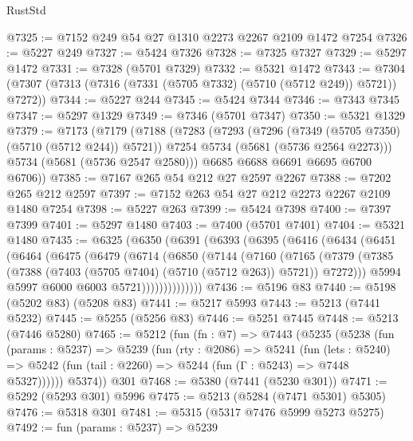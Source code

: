 \begin{lexlean}{RustStd}
\begin{coremodule}
@7325 := @7152 @249 @54 @27 @1310 @2273 @2267 @2109 @1472 @7254
@7326 := @5227 @249
@7327 := @5424 @7326
@7328 := @7325 @7327
@7329 := @5297 @1472
@7331 := @7328 (@5701 @7329)
@7332 := @5321 @1472
@7343 := @7304 (@7307 (@7313 (@7316 (@7331 (@5705 @7332) (@5710 (@5712 @249)) @5721)) @7272))
@7344 := @5227 @244
@7345 := @5424 @7344
@7346 := @7343 @7345
@7347 := @5297 @1329
@7349 := @7346 (@5701 @7347)
@7350 := @5321 @1329
@7379 := @7173
    (@7179
      (@7188
        (@7283
          (@7293
            (@7296 (@7349 (@5705 @7350) (@5710 (@5712 @244)) @5721))
            @7254
            @5734
            (@5681 (@5736 @2564 @2273)))
          @5734
          (@5681 (@5736 @2547 @2580)))
        @6685
        @6688
        @6691
        @6695
        @6700
        @6706))
@7385 := @7167 @265 @54 @212 @27 @2597 @2267
@7388 := @7202 @265 @212 @2597
@7397 := @7152 @263 @54 @27 @212 @2273 @2267 @2109 @1480 @7254
@7398 := @5227 @263
@7399 := @5424 @7398
@7400 := @7397 @7399
@7401 := @5297 @1480
@7403 := @7400 (@5701 @7401)
@7404 := @5321 @1480
@7435 := @6325
    (@6350
      (@6391
        (@6393
          (@6395
            (@6416
              (@6434
                (@6451
                  (@6464
                    (@6475
                      (@6479
                        (@6714
                          (@6850
                            (@7144
                              (@7160
                                (@7165
                                  (@7379
                                    (@7385
                                      (@7388 (@7403 (@5705 @7404) (@5710 (@5712 @263)) @5721))
                                      @7272)))
                                @5994
                                @5997
                                @6000
                                @6003
                                @5721))))))))))))))
@7436 := @5196 @83
@7440 := @5198 (@5202 @83) (@5208 @83)
@7441 := @5217 @5993
@7443 := @5213 (@7441 @5232)
@7445 := @5255 (@5256 @83)
@7446 := @5251 @7445
@7448 := @5213 (@7446 @5280)
@7465 := @5212
    (fun (fn : @7) =>
    @7443
      (@5235
        (@5238
          (fun (params : @5237) =>
          @5239
            (fun (rty : @2086) =>
            @5241
              (fun (lets : @5240) =>
              @5242 (fun (tail : @2260) => @5244 (fun (Γ : @5243) => @7448 @5327))))))
        @5374))
    @301
@7468 := @5380 (@7441 (@5230 @301))
@7471 := @5292 (@5293 @301) @5996
@7475 := @5213 (@5284 (@7471 @5301) @5305)
@7476 := @5318 @301
@7481 := @5315 (@5317 @7476 @5999 @5273 @5275)
@7492 := fun (params : @5237) =>
  @5239

\end{coremodule}
\end{lexlean}
